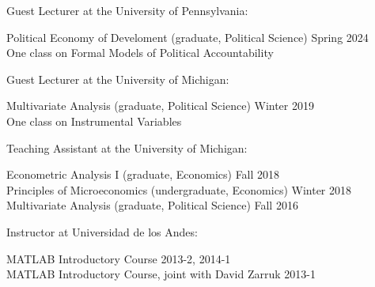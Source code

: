 \documentclass[10pt, english]{article}
\begin{document}
\vspace{-0.25cm}
Guest Lecturer at the University of Pennsylvania:
\vspace{-0.25cm}
\begin{flushright}
	\begin{minipage}{0.95\textwidth}
		Political Economy of Develoment (graduate, Political Science) \hfill Spring 2024\\
		One class on Formal Models of Political Accountability\\
	\end{minipage}
\end{flushright}

\vspace{-0.25cm}
Guest Lecturer at the University of Michigan:
\vspace{-0.2cm}
\begin{flushright}
\begin{minipage}{0.95\textwidth}
Multivariate Analysis (graduate, Political Science) \hfill Winter 2019\\
One class on Instrumental Variables\\
\end{minipage}
\end{flushright}

\vspace{-0.25cm}
Teaching Assistant at the University of Michigan:
\vspace{-0.2cm}
\begin{flushright}
\begin{minipage}{0.95\textwidth}
Econometric Analysis I (graduate, Economics) \hfill Fall 2018\\
Principles of Microeconomics (undergraduate, Economics) \hfill Winter 2018\\
Multivariate Analysis (graduate, Political Science) \hfill Fall 2016\\
\end{minipage}
\end{flushright}

\vspace{-0.25cm}
Instructor at Universidad de los Andes:
\vspace{-0.2cm}
\begin{flushright}
\begin{minipage}{0.95\textwidth}
MATLAB Introductory Course \hfill 2013-2, 2014-1\\
MATLAB Introductory Course, joint with David Zarruk \hfill 2013-1\\
\end{minipage}
\end{flushright}
\end{document}

